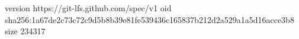 version https://git-lfs.github.com/spec/v1
oid sha256:1a67de2c73c72c9d5b8b39e81fe539436c165837b212d2a529a1a5d16acce3b8
size 234317
